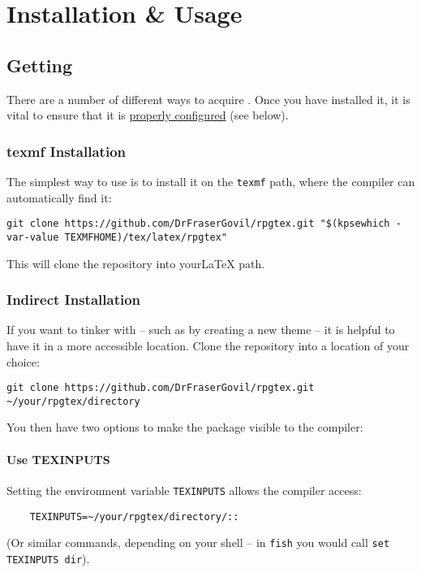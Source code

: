 
\chapter{Installation \& Usage}

	\section{Getting \rpgtex}

		There are a number of different ways to acquire \rpgtex{}. Once you have installed it, it is vital to ensure that it is \href{\ref{S:Configuration}}{properly configured} (see below).


		\subsection{texmf Installation}

			The simplest way to use \rpgtex{} is to install it on the \texttt{texmf} path, where the compiler can automatically find it:

			\begin{lstlisting}
git clone https://github.com/DrFraserGovil/rpgtex.git "$(kpsewhich -var-value TEXMFHOME)/tex/latex/rpgtex"
			\end{lstlisting}

			This will clone the repository into your\LaTeX{} path.

		\subsection{Indirect Installation}

			If you want to tinker with \rpgtex{} -- such as by creating a new theme -- it is helpful to have it in a more accessible location. Clone the repository into a location of your choice:

			\begin{lstlisting}
git clone https://github.com/DrFraserGovil/rpgtex.git ~/your/rpgtex/directory
			\end{lstlisting}

			You then have two options to make the package visible to the compiler:

			\subsubsection{Use TEXINPUTS}

			Setting the environment variable \verb|TEXINPUTS| allows the compiler access:
				\begin{lstlisting}
	TEXINPUTS=~/your/rpgtex/directory/::
				\end{lstlisting}
				(Or similar commands, depending on your shell -- in \texttt{fish} you would call \verb|set TEXINPUTS dir|).

